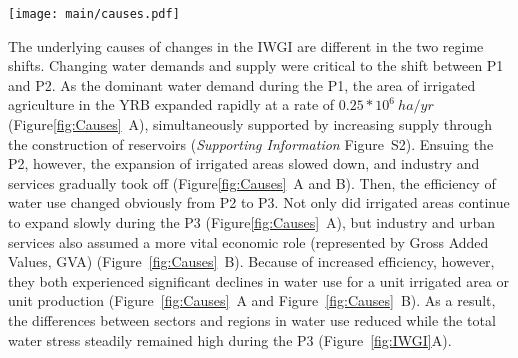 \begin{figure*}[th!]
	\centering
	\texttt{[image: main/causes.pdf]}
	\caption{
		Causes of water governance regime shifts in the YRB.\
		\textbf{A.} Changes in the total irrigated area (orange line) and water use intensity ($WU/A$, water use divided by the irrigated area, the green dot line).
		\textbf{B.} Changes in gross values added (GVA) of industry and services (blue line) and their water use intensities ($WU/GVA$ WU divided by the GVA, the red dot line).
		\textbf{C.} Completed time of each new reservoir and their located region's water use (LWU) percentages as a proportion of the total basinal water use (BWU) at that time. Red circles denote the reservoirs mainly for managing and regulating the whole basin.
		The size of each circle indicates the magnitude of its water storage capacity.
		\textbf{D.} Social transformations (red triangles) and national-level governance policies (the circles, different colours denote signed by different state institutions, see \textit{Supporting Information} Table~S2). The light grey bars count official documents related to the YRB on a basinal scale (the Yellow River Events).
	}\label{fig:Causes}
\end{figure*}

The underlying causes of changes in the IWGI are different in the two regime shifts.
Changing water demands and supply were critical to the shift between P1 and P2.
As the dominant water demand during the P1, the area of irrigated agriculture in the YRB expanded rapidly at a rate of $0.25*10^6~ha/yr$ (Figure\ref{fig:Causes}~A), simultaneously supported by increasing supply through the construction of reservoirs (\textit{Supporting Information} Figure~S2). %
Ensuing the P2, however, the expansion of irrigated areas slowed down, and industry and services gradually took off (Figure\ref{fig:Causes}~A and B).
Then, the efficiency of water use changed obviously from P2 to P3.
Not only did irrigated areas continue to expand slowly during the P3 (Figure\ref{fig:Causes}~A), but industry and urban services also assumed a more vital economic role (represented by Gross Added Values, GVA) (Figure~\ref{fig:Causes}~B).
Because of increased efficiency, however, they both experienced significant declines in water use for a unit irrigated area or unit production (Figure~\ref{fig:Causes}~A and Figure~\ref{fig:Causes}~B).
As a result, the differences between sectors and regions in water use reduced while the total water stress steadily remained high during the P3 (Figure~\ref{fig:IWGI}A).

